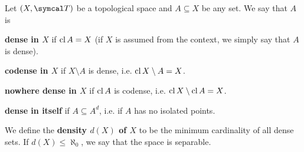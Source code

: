 \begin{definition}\label{def:topologically_dense_set}\cite[25]{Engelking1989}
  Let \( (X, \Cal{T}) \) be a topological space and \( A \subseteq X \) be any set. We say that \( A \) is

  \begin{defenum}
    \item\label{def:topologically_dense_set/dense} \textbf{dense in \( X \)} if \( \operatorname{cl}{A} = X \) (if \( X \) is assumed from the context, we simply say that \( A \) is dense).

    \item\label{def:topologically_dense_set/codense} \textbf{codense in \( X \)} if \( X \setminus A \) is dense, i.e. \( \operatorname{cl}{X \setminus A} = X \).

    \item\label{def:topologically_dense_set/nowhere_dense} \textbf{nowhere dense in \( X \)} if \( \operatorname{cl}{A} \) is codense, i.e. \( \operatorname{cl}{X \setminus \operatorname{cl}{A}} = X \).

    \item\label{def:topologically_dense_set/dense_in_itself} \textbf{dense in itself} if \( A \subseteq A^d \), i.e. if \( A \) has no isolated points.
  \end{defenum}

  We define the \textbf{density \( d(X) \) of \( X \)} to be the minimum cardinality of all dense sets. If \( d(X) \leq \aleph_0 \), we say that the space is separable.
\end{definition}
